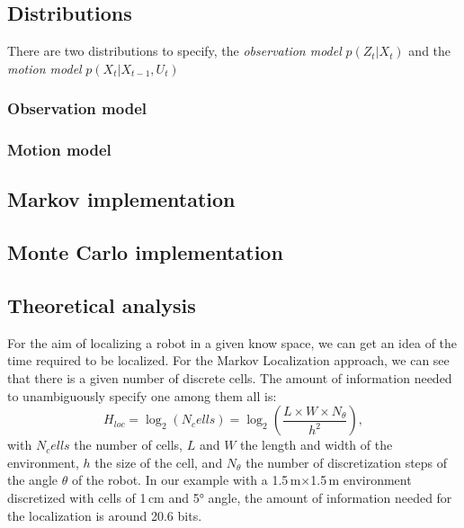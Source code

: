 \documentclass[letterpaper, 10pt, conference]{ieeeconf}
\begin{document}
\subsection{Distributions}

There are two distributions to specify, the \emph{observation model} $p(Z_t | X_t)$ and the \emph{motion model} $p(X_t|X_{t-1}, U_t)$

\subsubsection{Observation model}

\subsubsection{Motion model}

\subsection{Markov implementation}


\subsection{Monte Carlo implementation}

\subsection{Theoretical analysis}
For the aim of localizing a robot in a given know space, we can get an idea of the time required to be localized.
For the Markov Localization approach, we can see that there is a given number of discrete cells.
The amount of information needed to unambiguously specify one among them all is:
\begin{displaymath}
	H_{loc} = \log_2(N_cells) = \log_2\left(\frac{L\times W\times N_{\theta}}{h^2}\right),
\end{displaymath}
with $N_cells$ the number of cells, $L$ and $W$ the length and width of the environment, $h$ the size of the cell, and $N_{\theta}$ the number of discretization steps of the angle $\theta$ of the robot.
In our example with a 1.5\,m$\times$1.5\,m environment discretized with cells of 1\,cm and 5° angle, the amount of information needed for the localization is around 20.6 bits.
\end{document}
